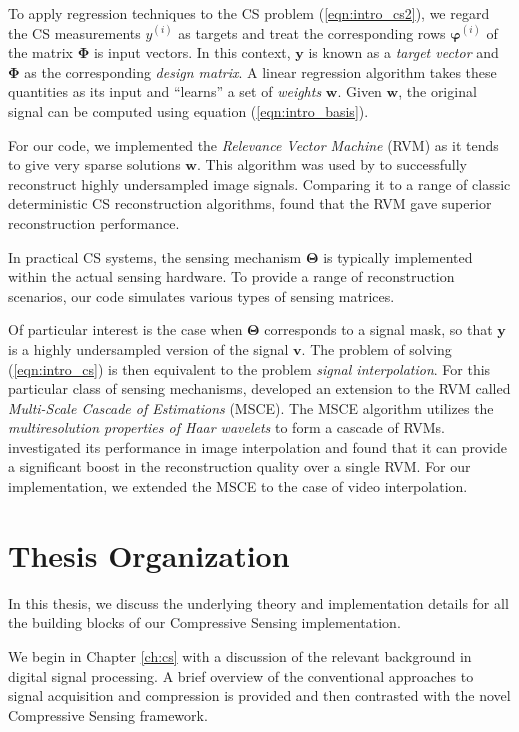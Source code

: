 To apply regression techniques to the CS problem (\ref{eqn:intro_cs2}), we regard the CS measurements $y^{(i)}$ as targets and treat the corresponding rows $\bm\varphi^{(i)}$ of the matrix $\bm\Phi$ is input vectors.
In this context, $\bm y$ is known as a \emph{target vector} and $\bm\Phi$ as the corresponding \emph{design matrix}.
A linear regression algorithm takes these quantities as its input and ``learns'' a set of \emph{weights} $\bm w$.
Given $\bm w$, the original signal can be computed using equation (\ref{eqn:intro_basis}).

For our code, we implemented the \emph{Relevance Vector Machine} (RVM) \cite{tipping2001,tipping2003} as it tends to give very sparse solutions $\bm w$.
This algorithm was used by \cite{pilikos2014} to successfully reconstruct highly undersampled image signals.
Comparing it to a range of classic deterministic CS reconstruction algorithms, \cite{pilikos2014} found that the RVM gave superior reconstruction performance.

In practical CS systems, the sensing mechanism $\bm\Theta$ is typically implemented within the actual sensing hardware.
To provide a range of reconstruction scenarios, our code simulates various types of sensing matrices.

Of particular interest is the case when $\bm\Theta$ corresponds to a signal mask, so that $\bm y$ is a highly undersampled version of the signal $\bm v$.
The problem of solving (\ref{eqn:intro_cs}) is then equivalent to the problem \emph{signal interpolation}.
For this particular class of sensing mechanisms, \cite{pilikos2014} developed an extension to the RVM called \emph{Multi-Scale Cascade of Estimations} (MSCE).
The MSCE algorithm utilizes the \emph{multiresolution properties of Haar wavelets} to form a cascade of RVMs.
\cite{pilikos2014} investigated its performance in image interpolation and found that it can provide a significant boost in the reconstruction quality over a single RVM.
For our implementation, we extended the MSCE to the case of video interpolation.

\section*{Thesis Organization}
In this thesis, we discuss the underlying theory and implementation details for all the building blocks of our Compressive Sensing implementation.

We begin in Chapter \ref{ch:cs} with a discussion of the relevant background in digital signal processing.
A brief overview of the conventional approaches to signal acquisition and compression is provided and then contrasted with the novel Compressive Sensing framework.


